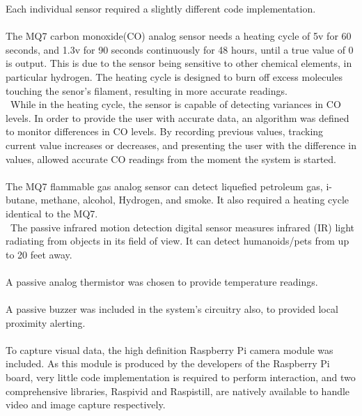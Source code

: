 \documentclass{article}
\begin{document}
Each individual sensor required a slightly different code implementation. \\\\
The MQ7 carbon monoxide(CO) analog sensor needs a heating cycle of 5v for 60 seconds, and 1.3v for 90 seconds continuously for 48 hours, until a true value of 0 is output. This is due to the sensor being sensitive to other chemical elements, in particular hydrogen. The heating cycle is designed to burn off excess molecules touching the senor’s filament, resulting in more accurate readings. \\\ While in the heating cycle, the sensor is capable of detecting variances in CO levels. In order to provide the user with accurate data, an algorithm was defined to monitor differences in CO levels. By recording previous values, tracking current value increases or decreases, and presenting the user with the difference in values, allowed accurate CO readings from the moment the system is started. \\\\
The MQ7 flammable gas analog sensor can detect liquefied petroleum gas, i-butane, methane, alcohol, Hydrogen, and smoke. It also required a heating cycle identical to the MQ7. \\\
The passive infrared motion detection digital sensor measures infrared (IR) light radiating from objects in its field of view. It can detect humanoids/pets from up to 20 feet away. \\\\
A passive analog thermistor was chosen to provide temperature readings. \\\\
A passive buzzer was included in the system’s circuitry also, to provided local proximity alerting. \\\\
To capture visual data, the high definition Raspberry Pi camera module was included. As this module is produced by the developers of the Raspberry Pi board, very little code implementation is required to perform interaction, and two comprehensive libraries, Raspivid and Raspistill,  are natively available to handle video and image capture respectively.
\end{document}
